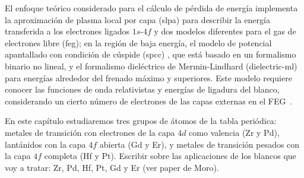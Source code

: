 El enfoque teórico considerado para el cálculo de pérdida de energía 
implementa la aproximación de plasma local por capa (\acs{slpa}) 
\cite{Montanari:13} para describir la energía transferida a los 
electrones ligados $1s$-$4f$ y dos modelos diferentes para el gas de 
electrones libre (\acs{feg}); en la región de baja energía, el modelo 
de potencial apantallado con condición de cúspide (\acs{spcc}) 
\cite{Montanari:17}, que está basado en un formalismo binario no lineal, 
y el formalismo dieléctrico de Mermin-Lindhard (\acs{dielectric-ml}) 
\cite{Mermin:70} para energías alrededor del frenado máximo y 
superiores. Este modelo requiere conocer las funciones de onda 
relativistas y energías de ligadura del blanco, considerando un cierto 
número de electrones de las capas externas en el FEG~\cite{Mendez:19}. 

En este capítulo estudiaremos tres grupos de átomos de la tabla 
periódica: metales de transición con electrones de la capa $4d$ como 
valencia (Zr y Pd), lantánidos con la capa $4f$ abierta (Gd y Er), 
y metales de transición pesados con la capa $4f$ completa (Hf y Pt). 
{\color{red} Escribir sobre las aplicaciones de los blancos que voy a 
tratar: Zr, Pd, Hf, Pt, Gd y Er  (ver paper de Moro).}


